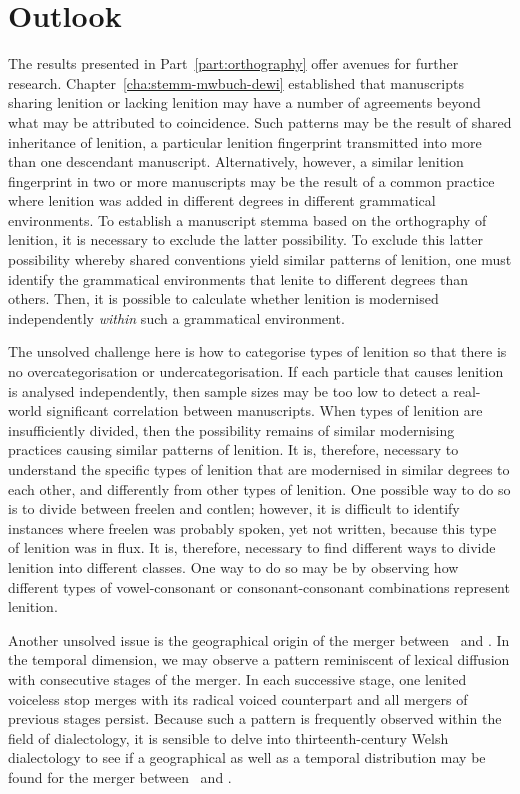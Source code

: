 \section{Outlook}
\label{sec:further-research}
The results presented in Part~\ref{part:orthography} offer avenues for further research. 
Chapter~\ref{cha:stemm-mwbuch-dewi} established that manuscripts sharing lenition or lacking lenition may have a number of agreements beyond what may be attributed to coincidence. Such patterns may be the result of shared inheritance of lenition, \ie a particular lenition fingerprint transmitted into more than one descendant manuscript. Alternatively, however, a similar lenition fingerprint in two or more manuscripts may be the result of a common practice where lenition was added in different degrees in different grammatical environments. To establish a manuscript stemma based on the orthography of lenition, it is necessary to exclude the latter possibility. To exclude this latter possibility whereby shared conventions yield similar patterns of lenition, one must identify the grammatical environments that lenite to different degrees than others. Then, it is possible to calculate whether lenition is modernised independently \emph{within} such a grammatical environment.

The unsolved challenge here is how to categorise types of lenition so that there is no overcategorisation or undercategorisation. If each particle that causes lenition is analysed independently, then sample sizes may be too low to detect a real-world significant correlation between manuscripts. When types of lenition are insufficiently divided, then the possibility remains of similar modernising practices causing similar patterns of lenition. It is, therefore, necessary to understand the specific types of lenition that  are modernised in similar degrees to each other, and differently from other types of lenition. One possible way to do so is to divide between \gls{freelen} and \gls{contlen}; however, it is difficult to identify instances where \gls{freelen} was probably spoken, yet not written, because this type of lenition was in flux. It is, therefore, necessary to find different ways to divide lenition into different classes. One way to do so may be by observing how different types of vowel-consonant or consonant-consonant combinations represent lenition.

Another unsolved issue is the geographical origin of the merger between \lT\ and \xD. In the temporal dimension, we may observe a pattern reminiscent of lexical diffusion with consecutive stages of the merger. In each successive stage, one lenited voiceless stop merges with its radical voiced counterpart and all mergers of previous stages persist. Because such a pattern is frequently observed within the field of dialectology, it is sensible to delve into thirteenth-century Welsh dialectology to see if a geographical as well as a temporal distribution may be found for the merger between \lT\ and \xD.

